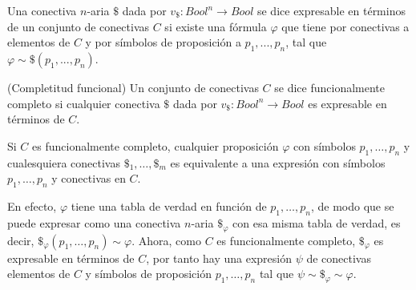 \begin{definition}
Una conectiva $n$-aria $\$$ dada por $v_{\$}: Bool^{n} \rightarrow Bool$ se dice expresable en términos de un conjunto de conectivas $C$ si existe una fórmula $\varphi$ que tiene por conectivas a elementos de $C$ y por símbolos de proposición a $p_1, ..., p_n$, tal que $\varphi \sim \$(p_1, ..., p_n)$. 
\end{definition}


\begin{definition}(Completitud funcional)
Un conjunto de conectivas $C$ se dice funcionalmente completo si cualquier conectiva $\$$ dada por $v_{\$}: Bool^{n} \rightarrow Bool$ es expresable en términos de $C$.
\end{definition}

\begin{example}
Si $C$ es funcionalmente completo, cualquier proposición $\varphi$ con símbolos $p_1,\dots,p_n$ y cualesquiera conectivas $\$_1,\dots,\$_m$ es equivalente a una expresión con símbolos $p_1,\dots,p_n$ y conectivas en $C$. 

En efecto, $\varphi$ tiene una tabla de verdad en función de $p_1,\dots,p_n$, de modo que se puede expresar como una conectiva $n$-aria $\$_\varphi$ con esa misma tabla de verdad, es decir, $\$_\varphi(p_1,\dots,p_n)\sim\varphi$. Ahora, como $C$ es funcionalmente completo, $\$_\varphi$ es  expresable en términos de $C$, por tanto hay una expresión $\psi$ de conectivas elementos de $C$ y símbolos de proposición $p_1,\dots,p_n$ tal que $\psi\sim\$_\varphi\sim\varphi$.
\end{example}



